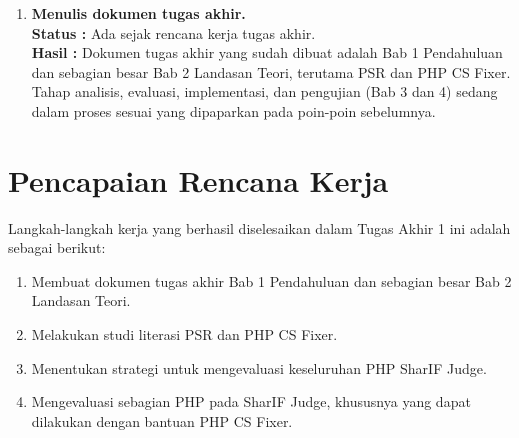 \documentclass[a4paper,twoside]{article}
\begin{document}
\begin{enumerate}
			\item \textbf{Menulis dokumen tugas akhir.}\\
			{\bf Status :} Ada sejak rencana kerja tugas akhir.\\
			{\bf Hasil :} Dokumen tugas akhir yang sudah dibuat adalah Bab 1 Pendahuluan dan sebagian besar Bab 2 Landasan Teori, terutama PSR dan PHP CS Fixer. Tahap analisis, evaluasi, implementasi, dan pengujian (Bab 3 dan 4) sedang dalam proses sesuai yang dipaparkan pada poin-poin sebelumnya.  
			
		\end{enumerate}
		
		\section{Pencapaian Rencana Kerja}
		Langkah-langkah kerja yang berhasil diselesaikan dalam Tugas Akhir 1 ini adalah sebagai berikut:
		\begin{enumerate}
			\item Membuat dokumen tugas akhir Bab 1 Pendahuluan dan sebagian besar Bab 2 Landasan Teori. 
			\item Melakukan studi literasi PSR dan PHP CS Fixer.
			\item Menentukan strategi untuk mengevaluasi keseluruhan PHP SharIF Judge.
			\item Mengevaluasi sebagian PHP pada SharIF Judge, khususnya yang dapat dilakukan dengan bantuan PHP CS Fixer.
		\end{enumerate}
	
\end{document}
